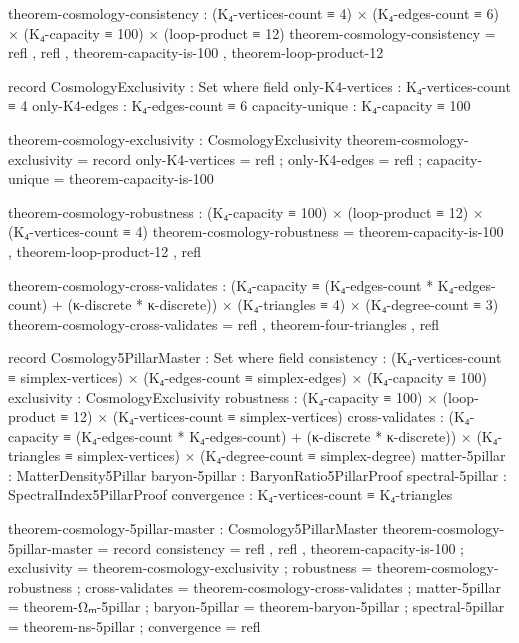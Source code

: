 \documentclass[11pt,a4paper]{book}
\begin{document}
\begin{code}
theorem-cosmology-consistency : (K₄-vertices-count ≡ 4)
                              × (K₄-edges-count ≡ 6)
                              × (K₄-capacity ≡ 100)
                              × (loop-product ≡ 12)
theorem-cosmology-consistency = refl
                              , refl
                              , theorem-capacity-is-100
                              , theorem-loop-product-12
\end{code}

\begin{code}
record CosmologyExclusivity : Set where
  field
    only-K4-vertices : K₄-vertices-count ≡ 4
    only-K4-edges    : K₄-edges-count ≡ 6
    capacity-unique  : K₄-capacity ≡ 100
    
theorem-cosmology-exclusivity : CosmologyExclusivity
theorem-cosmology-exclusivity = record
  { only-K4-vertices = refl
  ; only-K4-edges    = refl
  ; capacity-unique  = theorem-capacity-is-100
  }
\end{code}

\begin{code}
theorem-cosmology-robustness : (K₄-capacity ≡ 100)
                             × (loop-product ≡ 12)
                             × (K₄-vertices-count ≡ 4)
theorem-cosmology-robustness = theorem-capacity-is-100
                             , theorem-loop-product-12
                             , refl
\end{code}

\begin{code}
theorem-cosmology-cross-validates : (K₄-capacity ≡ (K₄-edges-count * K₄-edges-count) + (κ-discrete * κ-discrete))
                                  × (K₄-triangles ≡ 4)
                                  × (K₄-degree-count ≡ 3)
theorem-cosmology-cross-validates = refl , theorem-four-triangles , refl

record Cosmology5PillarMaster : Set where
  field
    consistency     : (K₄-vertices-count ≡ simplex-vertices) × (K₄-edges-count ≡ simplex-edges) × (K₄-capacity ≡ 100)
    exclusivity     : CosmologyExclusivity
    robustness      : (K₄-capacity ≡ 100) × (loop-product ≡ 12) × (K₄-vertices-count ≡ simplex-vertices)
    cross-validates : (K₄-capacity ≡ (K₄-edges-count * K₄-edges-count) + (κ-discrete * κ-discrete))
                    × (K₄-triangles ≡ simplex-vertices) × (K₄-degree-count ≡ simplex-degree)
    matter-5pillar  : MatterDensity5Pillar
    baryon-5pillar  : BaryonRatio5PillarProof
    spectral-5pillar : SpectralIndex5PillarProof
    convergence     : K₄-vertices-count ≡ K₄-triangles

theorem-cosmology-5pillar-master : Cosmology5PillarMaster
theorem-cosmology-5pillar-master = record
  { consistency     = refl , refl , theorem-capacity-is-100
  ; exclusivity     = theorem-cosmology-exclusivity
  ; robustness      = theorem-cosmology-robustness
  ; cross-validates = theorem-cosmology-cross-validates
  ; matter-5pillar  = theorem-Ωₘ-5pillar
  ; baryon-5pillar  = theorem-baryon-5pillar
  ; spectral-5pillar = theorem-ns-5pillar
  ; convergence     = refl
  }
\end{code}
\end{document}

